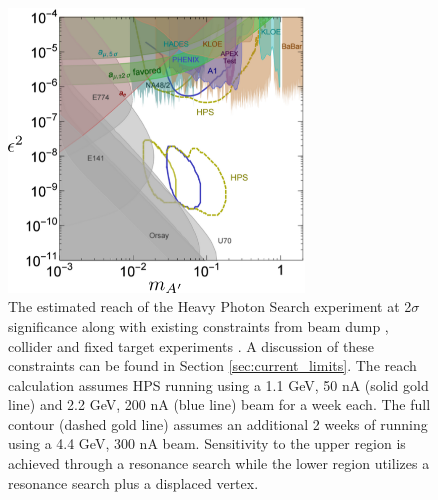 \begin{figure}[h!t]
    \centering
    \includegraphics[width=0.70\textwidth]{images/ap_current_constraints.png}
    \caption{The estimated reach of the Heavy Photon Search experiment at 
             2$\sigma$ significance along with existing constraints from 
             beam dump  \cite{Bjorken:1988as, riordan1987, bross1991, konaka1986, davier1989, 
             Bjorken:2009mm, andreas2012, Blumlein:1990ay, Blumlein:1991xh,
             johannes2011, johannes2014},  
             collider \cite{Reece:2009un, Aubert:2009cp,Babusci:2012cr, Archilli:2011zc} 
             and fixed target experiments \cite{}. A discussion of these 
             constraints can be found in Section \ref{sec:current_limits}.
             The reach calculation assumes HPS running using a 1.1 GeV, 50 nA 
             (solid gold line) and 2.2 GeV, 200 nA (blue line) beam for a week each.  The
             full contour (dashed gold line) assumes an additional 2 weeks of running 
             using a 4.4 GeV, 300 nA beam.
             Sensitivity to the upper region is achieved through a resonance search while
            the lower region utilizes a resonance search plus a displaced vertex.
    }
    \label{fig:ap_limits}
\end{figure}

